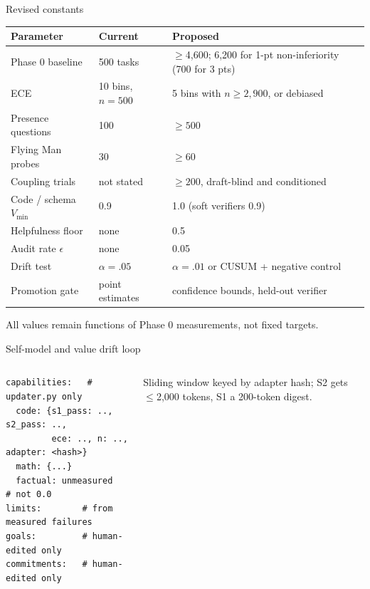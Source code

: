 \documentclass[aspectratio=169,10pt]{beamer}
\begin{document}
\begin{frame}{Revised constants}
\centering\small
\begin{tabular}{@{}lll@{}}
\toprule
Parameter & Current & Proposed\\\midrule
Phase 0 baseline & 500 tasks & $\ge$4,600; 6,200 for 1-pt non-inferiority (700 for 3 pts)\\
ECE & 10 bins, $n{=}500$ & 5 bins with $n\ge2{,}900$, or debiased\\
Presence questions & 100 & $\ge500$\\
Flying Man probes & 30 & $\ge60$\\
Coupling trials & not stated & $\ge200$, draft-blind and conditioned\\
Code / schema $V_{\min}$ & 0.9 & 1.0 (soft verifiers 0.9)\\
Helpfulness floor & none & 0.5\\
Audit rate $\epsilon$ & none & 0.05\\
Drift test & $\alpha=.05$ & $\alpha=.01$ or CUSUM + negative control\\
Promotion gate & point estimates & confidence bounds, held-out verifier\\\bottomrule
\end{tabular}

\vspace{4pt}\scriptsize All values remain functions of Phase 0 measurements, not fixed targets.
\end{frame}

\begin{frame}[fragile]{Self-model and value drift loop}
\begin{columns}[T]
\begin{lstlisting}
capabilities:   # updater.py only
  code: {s1_pass: .., s2_pass: ..,
         ece: .., n: .., adapter: <hash>}
  math: {...}
  factual: unmeasured   # not 0.0
limits:        # from measured failures
goals:         # human-edited only
commitments:   # human-edited only
\end{lstlisting}
\scriptsize Sliding window keyed by adapter hash; S2 gets $\le$2,000 tokens, S1 a 200-token digest.
\centering
{}
\end{columns}
\end{frame}
\end{document}

